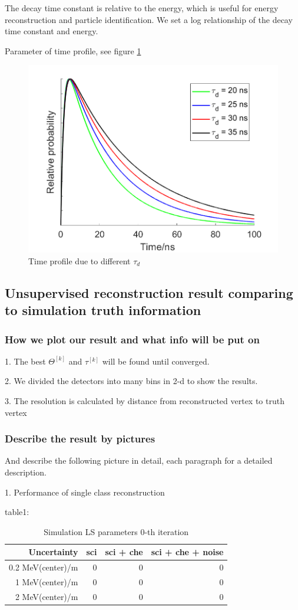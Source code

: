 \documentclass{article}
\begin{document}
\par The decay time constant is relative to the energy, which is useful for energy reconstruction and particle identification. We set a log relationship of the decay time constant and energy. 
\par Parameter of time profile, see figure \ref{fig:3}\\

	\begin{figure}[h]
	\centering\includegraphics[width=3 in]{./figure/time_profile.png}
	\caption{Time profile due to different $\tau_d$}
	\label{fig:3}
	\end{figure}
	
\subsection{Unsupervised reconstruction result comparing to simulation truth information}
\subsubsection{How we plot our result and what info will be put on}
\par 1. The best $\Theta^{[k]}$ and $\tau^{[k]}$ will be found until converged. 
\par 2. We divided the detectors into many bins in 2-d to show the results.
\par 3. The resolution is calculated by distance from reconstructed vertex to truth vertex \\ 

\subsubsection{Describe the result by pictures}
And describe the following picture in detail, each paragraph for a detailed description.
\par 1. Performance of single class reconstruction
\par table1:
	\begin{table}[htbp]
		\centering
		\caption{Simulation LS parameters 0-th iteration}
		\label{tab:4}	
		\begin{tabular}{|r|*{3}{r|}}
		\hline
		Uncertainty & sci & sci + che & sci + che + noise\\
		\hline
		0.2 MeV(center)/m & 0 & 0 & 0 \\
		1 MeV(center)/m & 0 & 0 & 0 \\
		2 MeV(center)/m & 0 & 0 & 0 \\
		\hline
		\end{tabular}
	\end{table}
	
\end{document}
